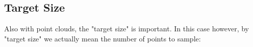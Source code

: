 \documentclass[11pt,a4paper]{article}
\begin{document}
\subsection{Target Size}
Also with point clouds, the "target size" is important. In this case however, by "target size" we actually mean the number of points to sample:
\begin{figure}[H]
    \centering
    \qquad

\end{figure}
\end{document}
